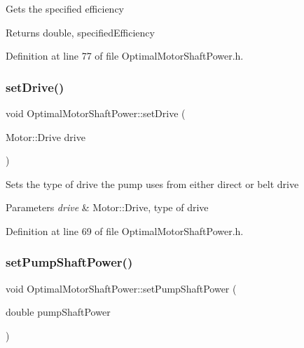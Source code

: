 Gets the specified efficiency \begin{DoxyReturn}{Returns}
double, specified\+Efficiency 
\end{DoxyReturn}


Definition at line 77 of file Optimal\+Motor\+Shaft\+Power.\+h.

\mbox{\label{class_optimal_motor_shaft_power_a8f3288a69848c61f4e8e2b14da549d16}} 
\subsubsection{\texorpdfstring{set\+Drive()}{setDrive()}}
{\footnotesize\ttfamily void Optimal\+Motor\+Shaft\+Power\+::set\+Drive (\begin{DoxyParamCaption}\item[{Motor\+::\+Drive}]{drive }\end{DoxyParamCaption})\hspace{0.3cm}{\ttfamily [inline]}}

Sets the type of drive the pump uses from either direct or belt drive 
\begin{DoxyParams}{Parameters}
{\em drive} & Motor\+::\+Drive, type of drive \\
\hline
\end{DoxyParams}


Definition at line 69 of file Optimal\+Motor\+Shaft\+Power.\+h.

\mbox{\label{class_optimal_motor_shaft_power_ab2d80927fbaa62705359700b2a8f2f26}} 
\subsubsection{\texorpdfstring{set\+Pump\+Shaft\+Power()}{setPumpShaftPower()}}
{\footnotesize\ttfamily void Optimal\+Motor\+Shaft\+Power\+::set\+Pump\+Shaft\+Power (\begin{DoxyParamCaption}\item[{double}]{pump\+Shaft\+Power }\end{DoxyParamCaption})\hspace{0.3cm}{\ttfamily [inline]}}

